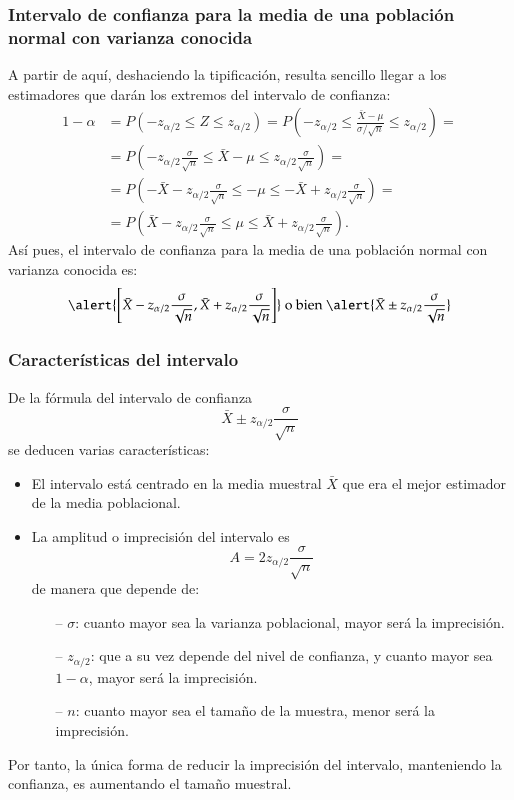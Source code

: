 \begin{frame}
\frametitle{Intervalo de confianza para la media de una población normal con varianza conocida}
A partir de aquí, deshaciendo la tipificación, resulta sencillo llegar a los estimadores que darán los extremos del intervalo de confianza:
\[
\begin{align*}
1-\alpha &= P(-z_{\alpha/2}\leq Z \leq z_{\alpha/2}) = P\left(-z_{\alpha/2}\leq \frac{\bar X -\mu}{\sigma/\sqrt{n}} \leq z_{\alpha/2}\right) =\\
&= P\left(-z_{\alpha/2}\frac{\sigma}{\sqrt{n}}\leq \bar X -\mu \leq z_{\alpha/2}\frac{\sigma}{\sqrt{n}}\right)=\\
&= P\left(-\bar{X}-z_{\alpha/2}\frac{\sigma}{\sqrt{n}}\leq -\mu \leq -\bar{X}+z_{\alpha/2}\frac{\sigma}{\sqrt{n}}\right)= \\
&= P\left(\bar{X}-z_{\alpha/2}\frac{\sigma}{\sqrt{n}}\leq \mu \leq \bar{X}+z_{\alpha/2}\frac{\sigma}{\sqrt{n}}\right).
\end{align*}
\]
Así pues, el intervalo de confianza para la media de una población normal con varianza conocida es:
\[
\alert{\left[\bar{X}-z_{\alpha/2}\frac{\sigma}{\sqrt{n}},\bar{X}+z_{\alpha/2}\frac{\sigma}{\sqrt{n}}\right]}
\mbox{ o bien } 
\alert{\bar{X}\pm z_{\alpha/2}\frac{\sigma}{\sqrt{n}}}
\]
\end{frame}


\begin{frame}
\frametitle{Características del intervalo}
De la fórmula del intervalo de confianza
\[
\bar{X}\pm z_{\alpha/2}\frac{\sigma}{\sqrt{n}}
\]
se deducen varias características:
\begin{itemize}
\item El intervalo está centrado en la media muestral $\bar X$ que era el mejor estimador de la media poblacional.
\item La amplitud o imprecisión del intervalo es 
\[
A= 2 z_{\alpha/2}\frac{\sigma}{\sqrt{n}}
\]
de manera que depende de:
\begin{itemize}
\item[--] $\sigma$: cuanto mayor sea la varianza poblacional, mayor será la imprecisión.
\item[--] $z_{\alpha/2}$: que a su vez depende del nivel de confianza, y cuanto mayor sea $1-\alpha$, mayor será la imprecisión.
\item[--] $n$: cuanto mayor sea el tamaño de la muestra, menor será la imprecisión. 
\end{itemize}
\end{itemize}
Por tanto, la única forma de reducir la imprecisión del intervalo, manteniendo la confianza, es aumentando el tamaño muestral.
\end{frame}



